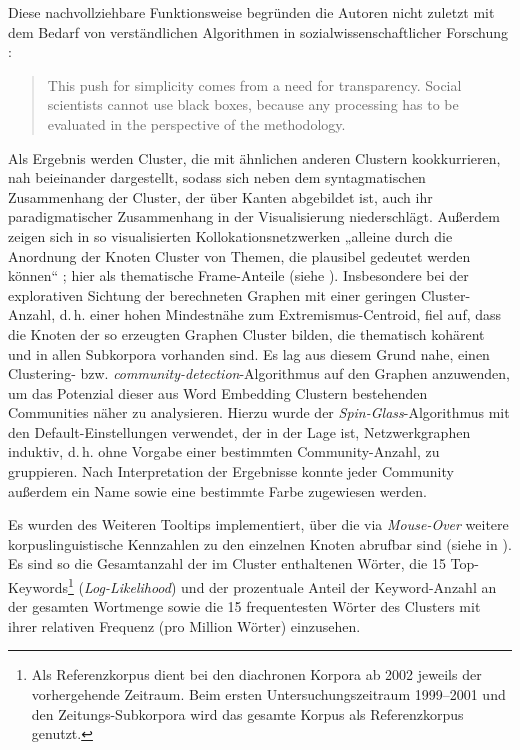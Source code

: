 Diese nachvollziehbare Funktionsweise begründen die Autoren nicht zuletzt mit dem Bedarf von verständlichen Algorithmen in sozialwissenschaftlicher Forschung \autocites[siehe zu einem entsprechenden Plädoyer auch][]{bubenhoferWennLinguistikKorpuslinguistik2018, bubenhoferMaschinelleTextanalyseIm2015}:

\begin{quote}
This push for simplicity comes from a need for transparency. Social scientists cannot use black boxes, because any processing has to be evaluated in the perspective of the methodology. \autocite[2]{jacomyForceAtlas2ContinuousGraph2014}
\end{quote}

Als Ergebnis werden Cluster, die mit ähnlichen anderen Clustern kookkurrieren, nah beieinander dargestellt, sodass sich neben dem syntagmatischen Zusammenhang der Cluster, der über Kanten abgebildet ist, auch ihr paradigmatischer Zusammenhang in der Visualisierung niederschlägt. Außerdem zeigen sich in so visualisierten Kollokationsnetzwerken „alleine durch die Anordnung der Knoten Cluster von Themen, die plausibel gedeutet werden können`` \autocite[231]{bubenhofer9DiskurslinguistikUnd2018}; hier als thematische Frame-Anteile (siehe ). Insbesondere bei der explorativen Sichtung der berechneten Graphen mit einer geringen Cluster-Anzahl, d.\,h. einer hohen Mindestnähe zum Extremismus-Centroid, fiel auf, dass die Knoten der so erzeugten Graphen Cluster bilden, die thematisch kohärent und in allen Subkorpora vorhanden sind. Es lag aus diesem Grund nahe, einen Clustering- bzw. \emph{community-detection}-Algorithmus auf den Graphen anzuwenden, um das Potenzial dieser aus Word Embedding Clustern bestehenden Communities näher zu analysieren. Hierzu wurde der \emph{Spin-Glass}-Algorithmus \autocite{reichardtStatisticalMechanicsCommunity2006} mit den Default-Einstellungen verwendet, der in der Lage ist, Netzwerkgraphen induktiv, d.\,h. ohne Vorgabe einer bestimmten Community-Anzahl, zu gruppieren. Nach Interpretation der Ergebnisse konnte jeder Community außerdem ein Name sowie eine bestimmte Farbe zugewiesen werden.

Es wurden des Weiteren Tooltips implementiert, über die via \emph{Mouse-Over} weitere korpuslinguistische Kennzahlen zu den einzelnen Knoten abrufbar sind (siehe  in ). Es sind so die Gesamtanzahl der im Cluster enthaltenen Wörter, die 15 Top-Keywords\footnote{Als Referenzkorpus dient bei den diachronen Korpora ab 2002 jeweils der vorhergehende Zeitraum. Beim ersten Untersuchungszeitraum 1999--2001 und den Zeitungs-Subkorpora wird das gesamte Korpus als Referenzkorpus genutzt.} (\emph{Log-Likelihood}) und der prozentuale Anteil der Keyword-Anzahl an der gesamten Wortmenge sowie die 15 frequentesten Wörter des Clusters mit ihrer relativen Frequenz (pro Million Wörter) einzusehen.

